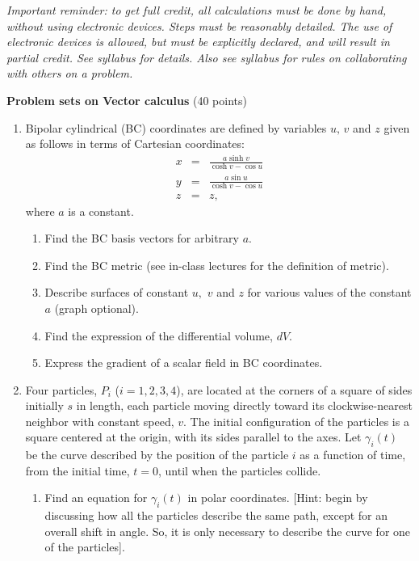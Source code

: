 \documentclass[fleqn]{article}
\begin{document}
\pagebreak

\vfill

  \emph{ Important reminder: to get full credit, all calculations must be done by hand, without using electronic devices. Steps must be reasonably detailed.  The use of electronic devices is allowed, but must be explicitly declared, and will result in partial credit. See syllabus for details. Also see syllabus for rules on collaborating with others on a problem. } 

  \pagebreak 

  \textbf{Problem sets on Vector calculus} (40 points)
  \begin{enumerate}

    \item Bipolar cylindrical (BC) coordinates are defined by variables $u,\,v$ and $z$ given as follows in terms of Cartesian coordinates: 
      \begin{eqnarray}
      x &=&\frac{a\sinh v}{\cosh v-\cos u}   \\
      y &=&\frac{a\sin u}{\cosh v-\cos u}   \\
      z &=&z,  
      \end{eqnarray}
      where $a$ is a constant.
    
      \begin{enumerate}
      
        \item Find the BC basis vectors for arbitrary $a$.
        
        \item Find the BC metric (see in-class lectures for the definition of metric).
        
        \item Describe surfaces of constant $u,$ $v$ and $z$ for various values of the constant $a$ (graph optional).

        \item Find the expression of the differential volume, $dV$.
        
        \item Express the gradient of a scalar field in BC coordinates.
      \end{enumerate}  
    
    \item Four particles, $P_i$ ($i=1,2,3,4$), are located at the corners of a square of sides initially $s$ in length, each particle moving directly toward its
      clockwise-nearest neighbor with constant speed, $v.$  The initial configuration of the particles is a square centered at the origin, with its sides parallel to the axes. 
      Let $\gamma_i(t)$ be the curve described by the position of the particle $i$ as a function of time, from the initial time, $t=0$, until when the particles collide. 
        \begin{enumerate}
        \item Find an equation for $\gamma_i(t)$ in polar coordinates. [Hint: begin by discussing how all the particles describe the same path, except for an overall shift in angle. So, it is only necessary to describe the curve for one of the particles]. 
    

\end{enumerate}
\end{enumerate}
\end{document}

